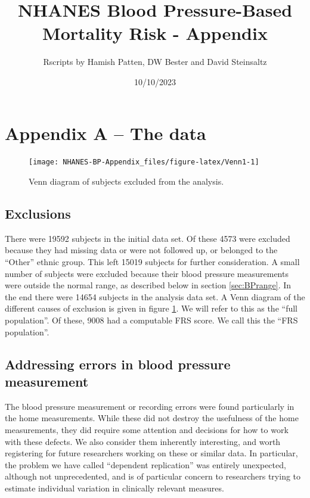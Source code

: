 \documentclass[
]{article}
\title{NHANES Blood Pressure-Based Mortality Risk - Appendix}
\author{Rscripts by Hamish Patten, DW Bester and David Steinsaltz}
\date{10/10/2023}
\begin{document}
\maketitle

{
\setcounter{tocdepth}{3}
\tableofcontents
}
\hypertarget{appendix-a-the-data}{%
\section{Appendix A -- The data}\label{appendix-a-the-data}}

\begin{figure}

{\centering \texttt{[image: NHANES-BP-Appendix\_files/figure-latex/Venn1-1]} 

}

\caption{Venn diagram of subjects excluded from the analysis.}\label{fig:Venn1}
\end{figure}

\hypertarget{exclusions}{%
\subsection{Exclusions}\label{exclusions}}

There were 19592 subjects in the initial data set.
Of these 4573 were excluded because they had missing data or were not followed up, or belonged to the ``Other'' ethnic group.
This left 15019 subjects for further consideration.
A small number of subjects were excluded because their blood pressure measurements were outside the normal range, as described below in section \ref{sec:BPrange}.
In the end there were 14654 subjects in the analysis data set.
A Venn diagram of the different causes of exclusion is given in figure \ref{fig:Venn1}.
We will refer to this as the ``full population''.
Of these, 9008 had a computable FRS score.
We call this the ``FRS population''.

\hypertarget{addressing-errors-in-blood-pressure-measurement}{%
\subsection{Addressing errors in blood pressure measurement}\label{addressing-errors-in-blood-pressure-measurement}}

The blood pressure measurement or recording errors were found particularly in the home measurements.
While these did not destroy the usefulness of the home measurements, they did require some attention and decisions for how to work with these defects.
We also consider them inherently interesting, and worth registering for future researchers working on these or similar data.
In particular, the problem we have called ``dependent replication'' was entirely unexpected, although not unprecedented, and is of particular concern to researchers trying to estimate individual variation in clinically relevant measures.
\end{document}
